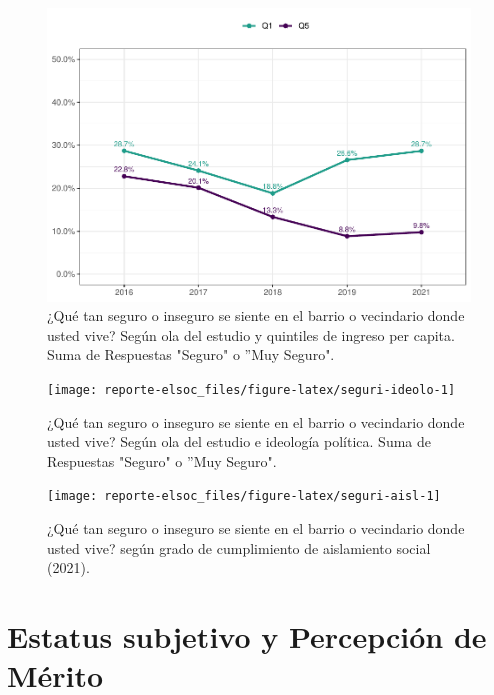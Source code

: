 \documentclass[
  12pt,
  openany]{book}
\begin{document}
\begin{figure}

{\centering \includegraphics{reporte-elsoc_files/figure-latex/seguri-quintil-1} 

}

\caption{¿Qué tan seguro o inseguro se siente en el barrio o vecindario donde usted vive? Según ola del estudio y quintiles de ingreso per capita. Suma de Respuestas "Seguro" o ”Muy Seguro".}\label{fig:seguri-quintil}
\end{figure}

\begin{figure}

{\centering \texttt{[image: reporte-elsoc\_files/figure-latex/seguri-ideolo-1]} 

}

\caption{¿Qué tan seguro o inseguro se siente en el barrio o vecindario donde usted vive? Según ola del estudio e ideología política. Suma de Respuestas "Seguro" o ”Muy Seguro".}\label{fig:seguri-ideolo}
\end{figure}

\begin{figure}

{\centering \texttt{[image: reporte-elsoc\_files/figure-latex/seguri-aisl-1]} 

}

\caption{¿Qué tan seguro o inseguro se siente en el barrio o vecindario donde usted vive? según grado de cumplimiento de aislamiento social (2021).}\label{fig:seguri-aisl}
\end{figure}

\hypertarget{estatus-subjetivo-y-percepciuxf3n-de-muxe9rito}{%
\chapter{Estatus subjetivo y Percepción de Mérito}\label{estatus-subjetivo-y-percepciuxf3n-de-muxe9rito}}
\end{document}
